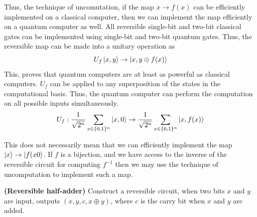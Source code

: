 Thus, the technique of uncomutation, if the map $x\rightarrow f(x)$ can be efficiently implemented on a classical computer, then we can implement the map efficiently on a quantum computer as well. All reversible single-bit and two-bit classical gates can be implemented using single-bit and two-bit quantum gates. Thus, the reversible map can be made into a unitary operation as
\[
U_f\ket{x,y}\rightarrow \ket{x,y\oplus f(x)}
\]
This, proves that quantum computers are at least as powerful as classical computers. $U_f$ can be applied to any superposition of the states in the computational basis. Thus, the quantum computer can perform the computation on all possible inputs simultaneously.
\[
U_f:\frac{1}{\sqrt{2^n}}\sum_{x\in\{0,1\}^n} \ket{x,0}\rightarrow \frac{1}{\sqrt{2^n}}\sum_{x\in\{0,1\}^n}\ket{x,f(x)}
\]

This does not necessarily mean that we can efficiently implement the map $\ket{x}\rightarrow \ket{f(x0}$. If $f$ is a bijection, and we have access to the inverse of the reversible circuit for computing $f^{-1}$ then we may use the technique of uncomputation to implement such a map.

\begin{example}
    \textbf{(Reversible half-adder)} Construct a reversible circuit, when two bits $x$ and $y$ are input, outputs $(x,y,c,x\oplus y)$, where $c$ is the carry bit when $x$ and $y$ are added.
\end{example}

